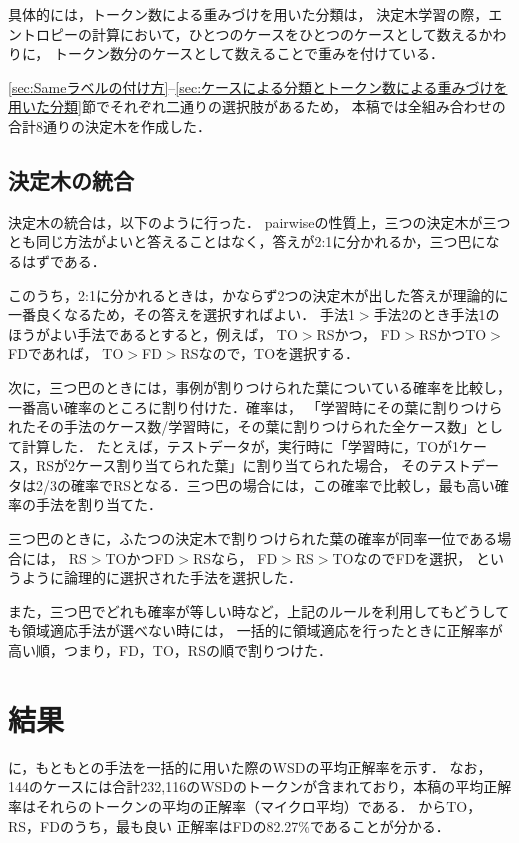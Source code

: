 \documentclass[japanese]{jnlp_1.4}
\newcommand{\tabref}[1]{}
\begin{document}
具体的には，トークン数による重みづけを用いた分類は，
決定木学習の際，エントロピーの計算において，ひとつのケースをひとつのケースとして数えるかわりに，
トークン数分のケースとして数えることで重みを付けている．

\ref{sec:Sameラベルの付け方}--\ref{sec:ケースによる分類とトークン数による重みづけを用いた分類}節でそれぞれ二通りの選択肢があるため，
本稿では全組み合わせの合計8通りの決定木を作成した．



\subsection{決定木の統合} \label{sec:決定木の統合}

決定木の統合は，以下のように行った．
pairwiseの性質上，三つの決定木が三つとも同じ方法がよいと答えることはなく，答えが2:1に分かれるか，三つ巴になるはずである．

このうち，2:1に分かれるときは，かならず2つの決定木が出した答えが理論的に一番良くなるため，その答えを選択すればよい．
手法1$>$手法2のとき手法1のほうがよい手法であるとすると，例えば， TO$>$RSかつ，
FD$>$RSかつTO$>$FDであれば，
TO$>$FD$>$RSなので，TOを選択する．

次に，三つ巴のときには，事例が割りつけられた葉についている確率を比較し，一番高い確率のところに割り付けた．確率は，
「学習時にその葉に割りつけられたその手法のケース数/学習時に，その葉に割りつけられた全ケース数」として計算した．
たとえば，テストデータが，実行時に「学習時に，TOが1ケース，RSが2ケース割り当てられた葉」に割り当てられた場合，
そのテストデータは2/3の確率でRSとなる．三つ巴の場合には，この確率で比較し，最も高い確率の手法を割り当てた．

三つ巴のときに，ふたつの決定木で割りつけられた葉の確率が同率一位である場合には，
RS$>$TOかつFD$>$RSなら，
FD$>$RS$>$TOなのでFDを選択，
というように論理的に選択された手法を選択した．

また，三つ巴でどれも確率が等しい時など，上記のルールを利用してもどうしても領域適応手法が選べない時には，
一括的に領域適応を行ったときに正解率が高い順，つまり，FD，TO，RSの順で割りつけた．


\section{結果} \label{Sec:結果}

\tabref{tab:table2}に，もともとの手法を一括的に用いた際のWSDの平均正解率を示す．
なお，144のケースには合計232,116のWSDのトークンが含まれており，本稿の平均正解率はそれらのトークンの平均の正解率（マイクロ平均）である．
\tabref{tab:table2}からTO，RS，FDのうち，最も良い
正解率はFDの82.27\%であることが分かる．
\end{document}
